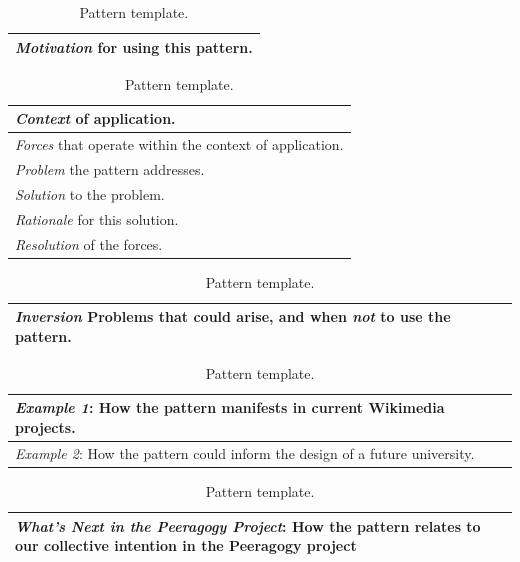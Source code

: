 \begin{table}
\vspace{-.60cm}
\begin{tabular}{|p{}|}
\hline
\emph{Motivation} for using this pattern.\\ \hline
\end{tabular}
\vspace{.1cm}

\begin{tabular}{|p{}|}
\hline
\emph{Context} of application.\\ \hline
\emph{Forces} that operate within the context of application. \\ \hline
\emph{Problem} the pattern addresses.\\ \hline
\emph{Solution} to the problem.\\ \hline
\emph{Rationale} for this solution.\\ \hline
\emph{Resolution} of the forces.\\ \hline
\end{tabular}
\vspace{.1cm}

\begin{tabular}{|p{}|}
\hline
\emph{Inversion} Problems that could arise, and when \emph{not} to use the pattern.\\ \hline
\end{tabular}
\vspace{.1cm}

\begin{tabular}{|p{}|}
\hline
\emph{Example 1}: How the pattern manifests in current Wikimedia projects.\\ \hline
\emph{Example 2}: How the pattern could inform the design of a future university.\\ \hline
\end{tabular}
\vspace{.1cm}

\begin{tabular}{|p{}|}
\hline
\emph{What's Next in the Peeragogy Project}: How the pattern relates to our collective intention in the Peeragogy project\\ \hline
\end{tabular}
\vspace{-.1cm}
\caption{Pattern template.\label{tab:pattern-template}}
\vspace{-.6cm}
\end{table}

